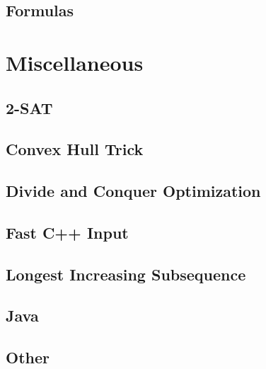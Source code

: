 \subsection{Formulas}
\raggedbottom
\hrulefill

\section{Miscellaneous}
\subsection{2-SAT}
\raggedbottom
\hrulefill
\subsection{Convex Hull Trick}
\raggedbottom
\hrulefill
\subsection{Divide and Conquer Optimization}
\raggedbottom
\hrulefill
\subsection{Fast C++ Input}
\raggedbottom
\hrulefill
\subsection{Longest Increasing Subsequence}
\raggedbottom
\hrulefill
\subsection{Java}
\raggedbottom
\hrulefill
\subsection{Other}
\raggedbottom
\hrulefill

